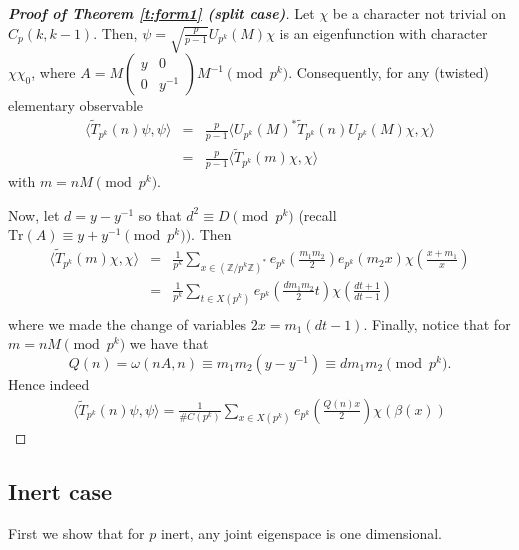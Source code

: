 \documentclass[12pt]{amsart}
\theoremstyle{definition}
\theoremstyle{remark}
\numberwithin{equation}{section}
\newcommand{\T}[1]{\tilde{T}_{#1}}
\newcommand{\bbZ}{\mathbb{Z}}
\newcommand{\Tr}{ \mbox{Tr}}
\begin{document}
\begin{proof}[\bf{Proof of Theorem \ref{t:form1}} (split case)]
Let $\chi$ be a character not trivial on $C_p(k,k-1)$. Then,
$\psi=\sqrt{\frac{p}{p-1}}U_{p^k}(M)\chi$ is an eigenfunction with
character $\chi\chi_0$, where $A=M\begin{pmatrix} y & 0\\ 0 &
y^{-1}\end{pmatrix}M^{-1}\pmod{p^k}$. Consequently, for any
(twisted) elementary observable
\begin{eqnarray*}
 \langle\T{p^k}(n)\psi,\psi\rangle &=&\frac{p}{p-1}\langle U_{p^k}(M)^*\T{p^k}(n)U_{p^k}(M)\chi,\chi\rangle\\
&=&\frac{p}{p-1}\langle \T{p^k}(m)\chi,\chi\rangle
\end{eqnarray*}
 with $m=nM\pmod{p^k}$.

Now, let $d=y-y^{-1}$ so that $d^2\equiv D \pmod {p^k}$ (recall
$\Tr(A)\equiv y+y^{-1}\pmod{p^k})$. Then
\begin{eqnarray*}
\langle \T{p^k}(m)\chi,\chi\rangle & = & \frac{1}{p^k}\sum_{x\in(\bbZ/p^k\bbZ)^*}e_{p^k}(\frac{m_1m_2}{2})e_{p^k}(m_2x)\chi(\frac{x+m_1}{x})\\
& = & \frac{1}{p^k}\sum_{t\in X(p^k)}e_{p^k}(\frac{dm_1m_2}{2}t)\chi(\frac{dt+1}{dt-1})\\
\end{eqnarray*}
where we made the change of variables $2x=m_1(dt-1)$. Finally,
notice that for $m=nM\pmod{p^k}$ we have that
\[Q(n)=\omega(nA,n)\equiv m_1m_2(y-y^{-1})\equiv dm_1m_2\pmod{p^k}.\]
Hence indeed
\begin{eqnarray*}
\langle \T{p^k}(n)\psi,\psi\rangle = \frac{1}{\# C(p^k)}\sum_{x\in
X(p^k)}e_{p^k}(\frac{Q(n)x}{2})\chi(\beta(x))
\end{eqnarray*}
\end{proof}

\subsection{Inert case}
First we show that for $p$ inert, any joint eigenspace is one
dimensional.
\end{document}
